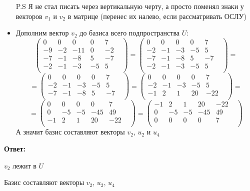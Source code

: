 \documentclass[a4paper,12pt]{article}
\begin{document}
\begin{itemize}
P.S Я не стал писать через вертикальную черту, а просто поменял знаки у векторов $v_1$ и $v_2$ в матрице (перенес их налево, если рассматривать ОСЛУ)
\item
Дополним вектор $v_2$ до базиса всего подпространства $U$:
\[
\begin{pmatrix}
0 & 0 & 0 & 0 & 7 & \\
-9 & -2 & -11 & 0 & -2 & \\
-7 & -1 & -8 & 5 & -7 & \\
-2 & -1 & -3 & -5 & 5 & \\
\end{pmatrix}
=
\begin{pmatrix}
0 & 0 & 0 & 0 & 7 & \\
-2 & -1 & -3 & -5 & 5 & \\
-7 & -1 & -8 & 5 & -7 & \\
-2 & -1 & -3 & -5 & 5 & \\
\end{pmatrix}
=
\]
\[
=
\begin{pmatrix}
0 & 0 & 0 & 0 & 7 & \\
-2 & -1 & -3 & -5 & 5 & \\
-7 & -1 & -8 & 5 & -7 & \\
\end{pmatrix}
=
\begin{pmatrix}
0 & 0 & 0 & 0 & 7 & \\
-2 & -1 & -3 & -5 & 5 & \\
-1 & 2 & 1 & 20 & -22 & \\
\end{pmatrix}
=
\]
\[
=
\begin{pmatrix}
0 & 0 & 0 & 0 & 7 & \\
0 & -5 & -5 & -45 & 49 & \\
-1 & 2 & 1 & 20 & -22 & \\
\end{pmatrix}
=
\begin{pmatrix}
-1 & 2 & 1 & 20 & -22 & \\
0 & -5 & -5 & -45 & 49 & \\
0 & 0 & 0 & 0 & 7 & \\
\end{pmatrix}
\]
А значит базис составляют векторы $v_2$, $u_2$ и $u_4$
\end{itemize}
{\large \begin{center}
\textbf{Ответ:}

$v_2$ лежит в $U$

Базис составляют векторы $v_2$, $u_2$, $u_4$
\end{center}}
\end{document}
